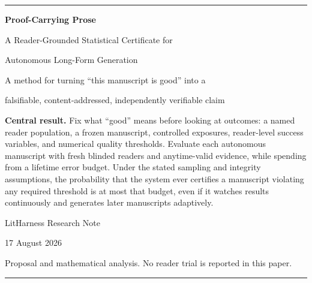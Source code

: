 \documentclass[11pt]{article}
\theoremstyle{remark}
\begin{document}
\hypersetup{pageanchor=false}
\begin{titlepage}
\vspace*{0.45in}
{\color{teal}\rule{\textwidth}{2.2pt}}

\vspace{0.32in}
{\Huge\bfseries Proof-Carrying Prose\par}
\vspace{0.10in}
{\LARGE A Reader-Grounded Statistical Certificate for\par Autonomous Long-Form Generation\par}

\vspace{0.34in}
{\large A method for turning ``this manuscript is good'' into a\par
falsifiable, content-addressed, independently verifiable claim\par}

\vfill
\begin{minipage}{0.94\textwidth}
\color{navy}
\textbf{Central result.} Fix what ``good'' means before looking at outcomes: a named
reader population, a frozen manuscript, controlled exposures, reader-level success
variables, and numerical quality thresholds. Evaluate each autonomous manuscript with
fresh blinded readers and anytime-valid evidence, while spending from a lifetime error
budget. Under the stated sampling and integrity assumptions, the probability that the
system ever certifies a manuscript violating any required threshold is at most that
budget, even if it watches results continuously and generates later manuscripts
adaptively.
\end{minipage}

\vfill
{\large LitHarness Research Note\par}
{\large 17 August 2026\par}
\vspace{0.22in}
{\small Proposal and mathematical analysis. No reader trial is reported in this paper.}

\vspace{0.34in}
{\color{teal}\rule{\textwidth}{2.2pt}}
\end{titlepage}

\hypersetup{pageanchor=true}
\end{document}

